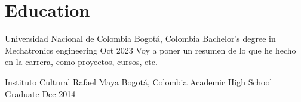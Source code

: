 \section*{Education}
\begin{entrylist}
    \entry
    {Universidad Nacional de Colombia}
    {Bogotá, Colombia}
    {Bachelor’s degree in Mechatronics engineering }
    {Oct 2023}
    {Voy a poner un resumen de lo que he hecho en la carrera, como proyectos, cursos, etc.
    }

    \entry
    {Instituto Cultural Rafael Maya}
    {Bogotá, Colombia}
    {Academic High School Graduate}
    {Dec 2014}
    {}
\end{entrylist}